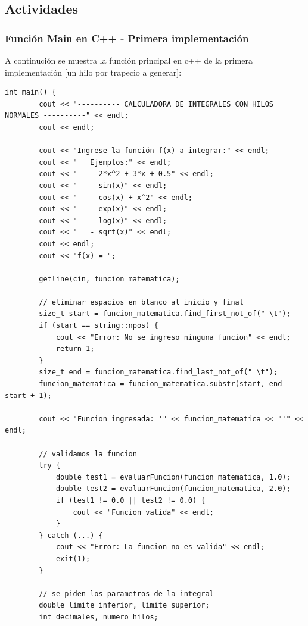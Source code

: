 \subsection {Actividades}

\subsubsection {Función Main en C++ - Primera implementación}

A continución se muestra la función principal en c++ de la primera implementación [un hilo por trapecio a generar]:

\begin{lstlisting}[style=cpp-style, caption={Función Main en cpp - Primera implementación}]
    int main() {
        cout << "---------- CALCULADORA DE INTEGRALES CON HILOS NORMALES ----------" << endl;
        cout << endl;
        
        cout << "Ingrese la función f(x) a integrar:" << endl;
        cout << "   Ejemplos:" << endl;
        cout << "   - 2*x^2 + 3*x + 0.5" << endl;
        cout << "   - sin(x)" << endl;
        cout << "   - cos(x) + x^2" << endl;
        cout << "   - exp(x)" << endl;
        cout << "   - log(x)" << endl;
        cout << "   - sqrt(x)" << endl;
        cout << endl;
        cout << "f(x) = ";
        
        getline(cin, funcion_matematica);
        
        // eliminar espacios en blanco al inicio y final
        size_t start = funcion_matematica.find_first_not_of(" \t");
        if (start == string::npos) {
            cout << "Error: No se ingreso ninguna funcion" << endl;
            return 1;
        }
        size_t end = funcion_matematica.find_last_not_of(" \t");
        funcion_matematica = funcion_matematica.substr(start, end - start + 1);
    
        cout << "Funcion ingresada: '" << funcion_matematica << "'" << endl;
    
        // validamos la funcion 
        try {
            double test1 = evaluarFuncion(funcion_matematica, 1.0);
            double test2 = evaluarFuncion(funcion_matematica, 2.0);
            if (test1 != 0.0 || test2 != 0.0) {
                cout << "Funcion valida" << endl;
            }
        } catch (...) {
            cout << "Error: La funcion no es valida" << endl;
            exit(1);
        }
        
        // se piden los parametros de la integral
        double limite_inferior, limite_superior;
        int decimales, numero_hilos;
        

\end{lstlisting}
